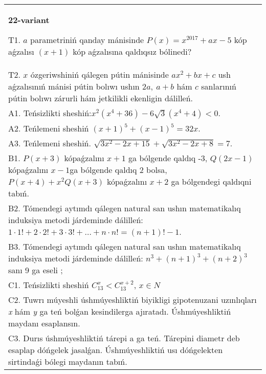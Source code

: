 \documentclass{article}
\begin{document}
\begin{tabular}{m{17cm}}
\textbf{22-variant}
\newline

T1. \(a\) parametriniń qanday mánisinde \(P(x) = x^{2017} + ax - 5\) kóp aǵzalısı \((x + 1)\) kóp aǵzalısına qaldıqsız bólinedi? \\
T2. \(x\) ózgeriwshiniń qálegen pútin mánisinde \(ax^{2} + bx + c\) ush aǵzalısınıń mánisi pútin bolıwı ushın \(2a,\ a + b\) hám \(c\) sanlarınıń pútin bolıwı zárurli hám jetkilikli ekenligin dálilleń. \\
A1. Teńsizlikti sheshiń:\(x^{2}\left( x^{4} + 36 \right) - 6\sqrt{3}\left( x^{4} + 4 \right) < 0\). \\
A2. Teńlemeni sheshiń \((x + 1)^{5} + (x - 1)^{5} = 32x\). \\
A3. Teńlemeni sheshiń. \(\sqrt{3x^{2} - 2x + 15} + \sqrt{3x^{2} - 2x + 8} = 7\). \\
B1. \(P(x + 3)\) kópaǵzalını \(x + 1\) ga bólgende qaldıq -3, \(Q(2x - 1)\) kópaǵzalını \(x - 1\)ga bólgende qaldıq 2 bolsa, \(P(x + 4) + x^{2}Q(x + 3)\) kópaǵzalını \(x + 2\) ga bólgendegi qaldıqni tabıń. \\
B2. Tómendegi aytımdı qálegen natural san ushın matematikalıq induksiya metodi járdeminde dálilleń: \(1 \cdot 1! + 2 \cdot 2! + 3 \cdot 3! + \ldots + n \cdot n! = (n + 1)! - 1\). \\
B3. Tómendegi aytımdı qálegen natural san ushın matematikalıq induksiya metodi járdeminde dálilleń: \(n^{3} + (n + 1)^{3} + (n + 2)^{3}\) sanı 9 ga eseli ; \\
C1. Teńsizlikti sheshiń \(C_{13}^{x} < C_{13}^{x + 2}\), \(x \in N\) \\
C2. Tuwrı múyeshli úshmúyeshliktiń biyikligi gipotenuzani uzınlıqları \emph{x} hám \emph{y} ga teń bolǵan kesindilerga ajıratadı. Úshmúyeshliktiń maydanı esaplansın. \\
C3. Durıs úshmúyeshliktiń tárepi a ga teń. Tárepini diametr deb esaplap dóńgelek jasalǵan. Úshmúyeshliktiń usı dóńgelekten sirtindaǵi bólegi maydanın tabıń. \\

\end{tabular}
\vspace{1cm}
\end{document}
